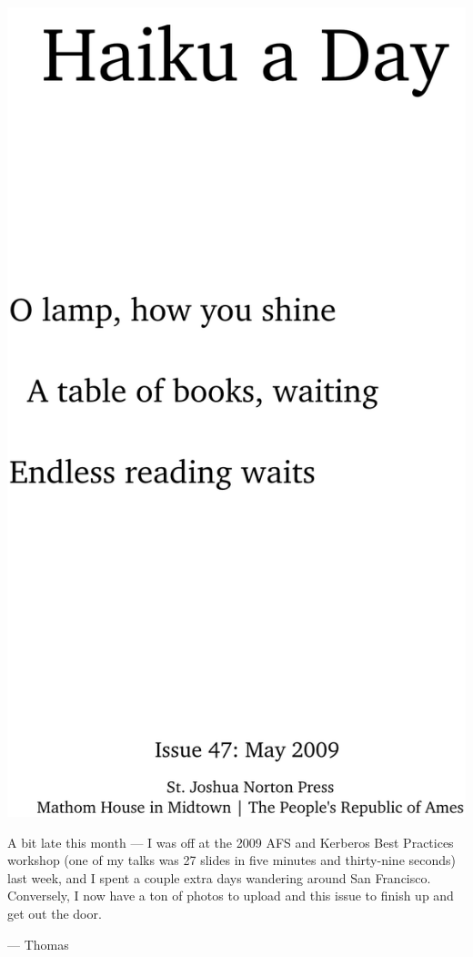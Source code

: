 \documentclass[12pt]{article}
\begin{document}
\includegraphics{frontpage.png}

\newpage

A bit late this month --- I was off at the 2009 AFS and Kerberos
Best Practices workshop (one of my talks was 27 slides in 
five minutes and thirty-nine seconds) last week, and I spent a
couple extra days wandering around San Francisco. Conversely, I 
now have a ton of photos to upload and this issue to finish up
and get out the door.


--- Thomas
\end{document}
